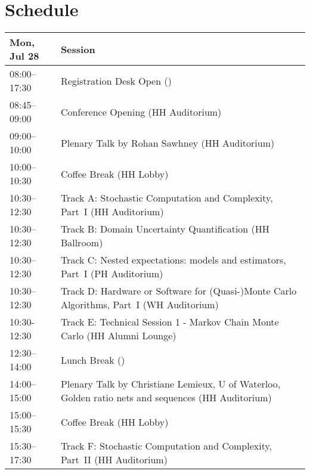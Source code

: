 \chapter{Schedule}
\begin{table}
{\footnotesize
\begin{tabularx}{\textwidth}{>{\hsize=0.32\hsize}X|>{\hsize=1.7\hsize}X}
\hline
\textbf{Mon, Jul 28} & \textbf{Session} \\
\hline
\cellcolor{\EmptyColor}08:00–17:30 & \cellcolor{\EmptyColor}Registration Desk Open () \\
\cellcolor{\PlenaryColor}08:45–09:00 & \cellcolor{\PlenaryColor}Conference Opening (HH Auditorium) \\
\cellcolor{\PlenaryColor}09:00–10:00 & \cellcolor{\PlenaryColor}Plenary Talk by Rohan Sawhney (HH Auditorium) \\
\cellcolor{\EmptyColor}10:00–10:30 & \cellcolor{\EmptyColor}Coffee Break (HH Lobby) \\
\cellcolor{\SessionTitleColor}10:30–12:30 & \cellcolor{\SessionTitleColor}Track A: Stochastic Computation and Complexity, Part~I (HH Auditorium) \\
\cellcolor{\SessionTitleColor}10:30–12:30 & \cellcolor{\SessionTitleColor}Track B: Domain Uncertainty Quantification (HH Ballroom) \\
\cellcolor{\SessionTitleColor}10:30–12:30 & \cellcolor{\SessionTitleColor}Track C: Nested expectations: models and estimators, Part~I (PH Auditorium) \\
\cellcolor{\SessionTitleColor}10:30–12:30 & \cellcolor{\SessionTitleColor}Track D: Hardware or Software for (Quasi-)Monte Carlo Algorithms, Part~I (WH Auditorium) \\
\cellcolor{\SessionLightColor}10:30-12:30 & \cellcolor{\SessionLightColor}Track E: Technical Session 1 - Markov Chain Monte Carlo (HH Alumni Lounge) \\
\cellcolor{\EmptyColor}12:30–14:00 & \cellcolor{\EmptyColor}Lunch Break () \\
\cellcolor{\PlenaryColor}14:00–15:00 & \cellcolor{\PlenaryColor}Plenary Talk by Christiane Lemieux, U of Waterloo, Golden ratio nets and sequences (HH Auditorium) \\
\cellcolor{\EmptyColor}15:00–15:30 & \cellcolor{\EmptyColor}Coffee Break (HH Lobby) \\
\cellcolor{\SessionTitleColor}15:30–17:30 & \cellcolor{\SessionTitleColor}Track F: Stochastic Computation and Complexity, Part~II (HH Auditorium) \\

\end{tabularx}}
\end{table}
